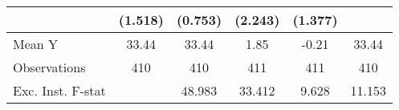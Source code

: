 {\begin{tabular}{l*{5}{c}}
            &     (1.518)         &     (0.753)         &     (2.243)         &     (1.377)         &                     \\
\midrule
Mean Y      &       33.44         &       33.44         &        1.85         &       -0.21         &       33.44         \\
Observations&         410         &         410         &         411         &         411         &         410         \\
Exc. Inst. F-stat&                     &      48.983         &      33.412         &       9.628         &      11.153         \\
\bottomrule
\end{tabular}
}
